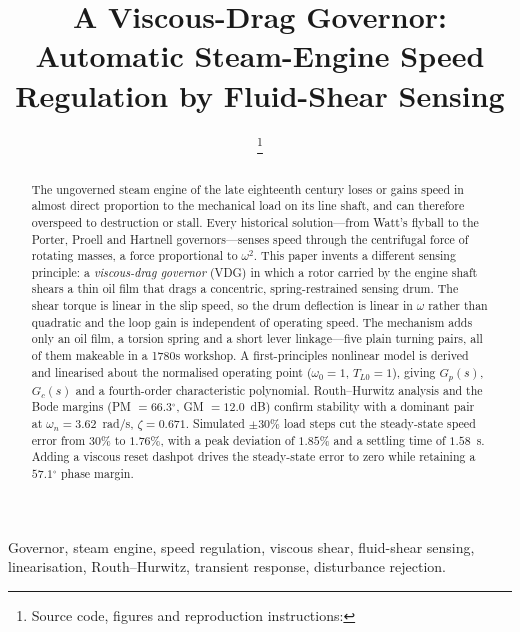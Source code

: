 \documentclass[conference]{IEEEtran}
\newcommand{\dg}{\ensuremath{^{\circ}}}
\begin{document}
\title{A Viscous-Drag Governor: Automatic Steam-Engine Speed\\
Regulation by Fluid-Shear Sensing}

\author{
\thanks{Source code, figures and reproduction instructions: \repourl}
}

\maketitle

\begin{abstract}
The ungoverned steam engine of the late eighteenth century loses or gains speed in
almost direct proportion to the mechanical load on its line shaft, and can therefore
overspeed to destruction or stall. Every historical solution---from Watt's flyball to
the Porter, Proell and Hartnell governors---senses speed through the centrifugal
force of rotating masses, a force proportional to $\omega^{2}$. This paper invents a
different sensing principle: a \emph{viscous-drag governor} (VDG) in which a rotor
carried by the engine shaft shears a thin oil film that drags a concentric,
spring-restrained sensing drum. The shear torque is linear in the slip speed, so the
drum deflection is linear in $\omega$ rather than quadratic and the loop gain is
independent of operating speed. The mechanism adds only an oil film, a torsion spring
and a short lever linkage---five plain turning pairs, all of them makeable in a 1780s
workshop. A first-principles nonlinear model is derived and linearised about the
normalised operating point ($\omega_0=1$, $T_{L0}=1$), giving $G_p(s)$, $G_c(s)$ and
a fourth-order characteristic polynomial. Routh--Hurwitz analysis and the Bode
margins (PM $=66.3\dg$, GM $=12.0$~dB) confirm stability with a dominant pair at
$\omega_n=3.62$~rad/s, $\zeta=0.671$. Simulated $\pm30\%$ load steps cut the
steady-state speed error from $30\%$ to $1.76\%$, with a peak deviation of $1.85\%$
and a settling time of $1.58$~s. Adding a viscous
reset dashpot drives the steady-state error to zero while retaining a $57.1\dg$
phase margin.
\end{abstract}

\begin{IEEEkeywords}
Governor, steam engine, speed regulation, viscous shear, fluid-shear sensing,
linearisation, Routh--Hurwitz, transient response, disturbance rejection.
\end{IEEEkeywords}
\end{document}
